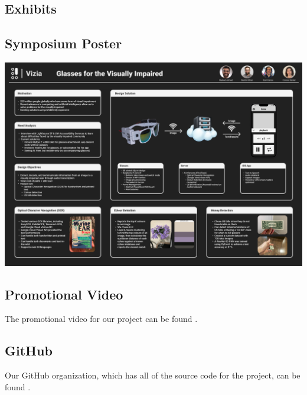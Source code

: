 \documentclass[a4paper,11pt]{article}
\begin{document}
\newpage
\begin{landscape}
    \section{Exhibits}
    \subsection{Symposium Poster}
    \begin{center}
        \includegraphics[width={0.95\linewidth}]{img/symposium_poster.png}
    \end{center}
\end{landscape}

\subsection{Promotional Video}
The promotional video for our project can be found \href{https://www.youtube.com/watch?v=aw0gHmt1xBc}{\color{blue}{here}}.

\subsection{GitHub}
Our GitHub organization, which has all of the source code for the project, can be found \href{https://github.com/vizia-fydp}{\color{blue}{here}}.
\end{document}
